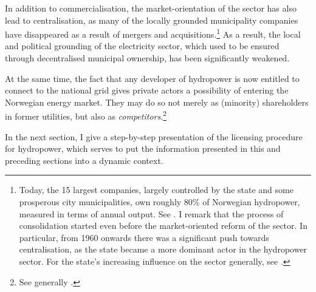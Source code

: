 In addition to commercialisation, the market-orientation of the sector has also lead to centralisation, as many of the locally grounded municipality companies have disappeared as a result of mergers and acquisitions.\footnote{Today, the 15 largest companies, largely controlled by the state and some prosperous city municipalities, own roughly 80\% of Norwegian hydropower, measured in terms of annual output. See \cite[28]{otprp61}. I remark that the process of consolidation started even before the market-oriented reform of the sector. In particular, from 1960 onwards there was a significant push towards centralisation, as the state became a more dominant actor in the hydropower sector. For the state's increasing influence on the sector generally, see \cite{skjold06,thue06b}.} As a result, the local and political grounding of the electricity sector, which used to be ensured through decentralised municipal ownership, has been significantly weakened.

At the same time, the fact that any developer of hydropower is now entitled to connect to the national grid gives private actors a possibility of entering the Norwegian energy market. They may do so not merely as (minority) shareholders in former utilities, but also as {\it competitors}.\footnote{See generally \cite{larsen06,larsen08,larsen12}.}

In the next section, I give a step-by-step presentation of the licensing procedure for hydropower, which serves to put the information presented in this and preceding sections into a dynamic context.

